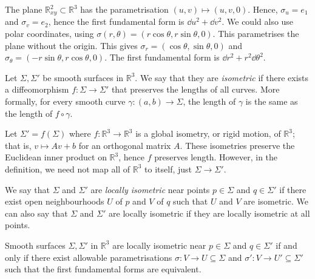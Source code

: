 \begin{example}
	The plane \( \mathbb R^2_{xy} \subset \mathbb R^3 \) has the parametrisation \( (u,v) \mapsto (u,v,0) \).
	Hence, \( \sigma_u = e_1 \) and \( \sigma_v = e_2 \), hence the first fundamental form is \( \dd{u}^2 + \dd{v}^2 \).
	We could also use polar coordinates, using \( \sigma(r,\theta) = (r\cos\theta,r\sin\theta,0) \).
	This parametrises the plane without the origin.
	This gives \( \sigma_r = (\cos\theta,\sin\theta,0) \) and \( \sigma_\theta = (-r\sin\theta, r\cos\theta,0) \).
	The first fundamental form is \( \dd{r}^2 + r^2 \dd{\theta}^2 \).
\end{example}
\begin{definition}
	Let \( \Sigma, \Sigma' \) be smooth surfaces in \( \mathbb R^3 \).
	We say that they are \textit{isometric} if there exists a diffeomorphism \( f\colon \Sigma \to \Sigma' \) that preserves the lengths of all curves.
	More formally, for every smooth curve \( \gamma \colon (a,b) \to \Sigma \), the length of \( \gamma \) is the same as the length of \( f \circ \gamma \).
\end{definition}
\begin{example}
	Let \( \Sigma' = f(\Sigma) \) where \( f \colon \mathbb R^3 \to \mathbb R^3 \) is a global isometry, or rigid motion, of \( \mathbb R^3 \); that is, \( v \mapsto Av+b \) for an orthogonal matrix \( A \).
	These isometries preserve the Euclidean inner product on \( \mathbb R^3 \), hence \( f \) preserves length.
	However, in the definition, we need not map all of \( \mathbb R^3 \) to itself, just \( \Sigma \to \Sigma' \).
\end{example}
\begin{definition}
	We say that \( \Sigma \) and \( \Sigma' \) are \textit{locally isometric} near points \( p \in \Sigma \) and \( q \in \Sigma' \) if there exist open neighbourhoods \( U \) of \( p \) and \( V \) of \( q \) such that \( U \) and \( V \) are isometric.
	We can also say that \( \Sigma \) and \( \Sigma' \) are locally isometric if they are locally isometric at all points.
\end{definition}
\begin{lemma}
	Smooth surfaces \( \Sigma, \Sigma' \) in \( \mathbb R^3 \) are locally isometric near \( p \in \Sigma \) and \( q \in \Sigma' \) if and only if there exist allowable parametrisations \( \sigma \colon V \to U \subseteq \Sigma \) and \( \sigma' \colon V \to U' \subseteq \Sigma' \) such that the first fundamental forms are equivalent.
\end{lemma}
